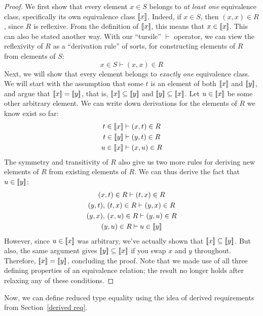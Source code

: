 \documentclass[../generics]{subfiles}
\begin{document}
\begin{proof}
We first show that every element $x\in S$ belongs to \emph{at least one} equivalence class, specifically its own equivalence class $[\![x]\!]$. Indeed, if $x\in S$, then $(x,x)\in R$, since $R$ is reflexive. From the definition of $[\![x]\!]$, this means that $x\in[\![x]\!]$. This can also be stated another way. With our ``tursile'' $\vdash$ operator, we can view the reflexivity of $R$ as a ``derivation rule'' of sorts, for constructing elements of $R$ from elements of $S$:
\[x\in S\vdash (x,x)\in R\]
Next, we will show that every element belongs to \emph{exactly one} equivalence class. We will start with the assumption that some $t$ is an element of both $[\![x]\!]$ and $[\![y]\!]$, and argue that $[\![x]\!]=[\![y]\!]$, that is, $[\![x]\!]\subseteq[\![y]\!]$ and $[\![y]\!]\subseteq[\![x]\!]$. Let $u\in[\![x]\!]$ be some other arbitrary element. We can write down derivations for the elements of $R$ we know exist so far:
\begin{gather*}
t\in[\![x]\!]\vdash(x, t)\in R\\
t\in[\![y]\!]\vdash(y, t)\in R\\
u\in[\![x]\!]\vdash(x, u)\in R
\end{gather*}
The symmetry and transitivity of $R$ also give us two more rules for deriving new elements of $R$ from existing elements of $R$. We can thus derive the fact that $u\in[\![y]\!]$:
\begin{gather*}
(x, t)\in R\vdash(t, x)\in R\\
(y, t),\,(t, x)\in R\vdash (y, x)\in R\\
(y, x),\,(x, u)\in R\vdash (y, u)\in R\\
(y, u)\in R\vdash u\in[\![y]\!]
\end{gather*}
However, since $u\in[\![x]\!]$ was arbitrary, we've actually shown that $[\![x]\!]\subseteq[\![y]\!]$. But also, the same argument gives $[\![y]\!]\subseteq[\![x]\!]$ if you swap $x$ and $y$ throughout. Therefore, $[\![x]\!]=[\![y]\!]$, concluding the proof. Note that we made use of all three defining properties of an equivalence relation; the result no longer holds after relaxing any of these conditions.
\end{proof}
Now, we can define reduced type equality using the idea of derived requirements from Section~\ref{derived req}.
\end{document}
